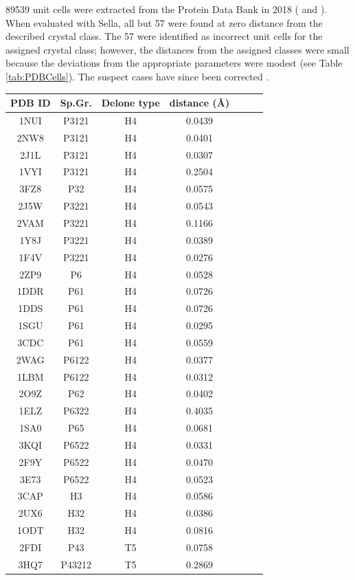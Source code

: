 \documentclass[preprint]{iucr}              %
\begin{document}
	89539 unit cells were extracted from the Protein Data Bank 
	in 2018
	( and ). 
	When evaluated with Sella, all but 57 were found at zero 
	distance from the described crystal class. The 57 were 
	identified as incorrect unit cells for the assigned 
	crystal class; however, the distances from the assigned 
	classes were small because the deviations from the 
	appropriate parameters were modest (see Table \ref{tab:PDBCells}).
	The suspect cases have since been corrected \cite{Burley_personal_communication}.
	\begin{table}
		
		\begin{tabular}{ccccccc}
			\toprule
			PDB ID & Sp.Gr. & Delone type&distance ({{\AA}}) \\ 
			\midrule
			1NUI&P3121&H4&0.0439\\ 
			2NW8&P3121&H4&0.0401\\ 
			2J1L&P3121&H4&0.0307\\ 
			1VYI&P3121&H4&0.2504\\ 
			3FZ8&P32&H4&0.0575\\ 
			2J5W&P3221&H4&0.0543\\ 
			2VAM&P3221&H4&0.1166\\ 
			1Y8J&P3221&H4&0.0389\\ 
			1F4V&P3221&H4&0.0276\\ 
			2ZP9&P6&H4&0.0528\\ 
			1DDR&P61&H4&0.0726\\ 
			1DDS&P61&H4&0.0726\\ 
			1SGU&P61&H4&0.0295\\ 
			3CDC&P61&H4&0.0559\\ 
			2WAG&P6122&H4&0.0377\\ 
			1LBM&P6122&H4&0.0312\\ 
			2O9Z&P62&H4&0.0402\\ 
			1ELZ&P6322&H4&0.4035\\ 
			1SA0&P65&H4&0.0681\\ 
			3KQI&P6522&H4&0.0331\\ 
			2F9Y&P6522&H4&0.0470\\ 
			3E73&P6522&H4&0.0523\\ 
			3CAP&H3&H4&0.0586\\ 
			2UX6&H32&H4&0.0386\\ 
			1ODT&H32&H4&0.0816\\ 
			2FDI&P43&T5&0.0758\\ 
			3HQ7&P43212&T5&0.2869\\ 

\end{tabular}
\end{table}
\end{document}
